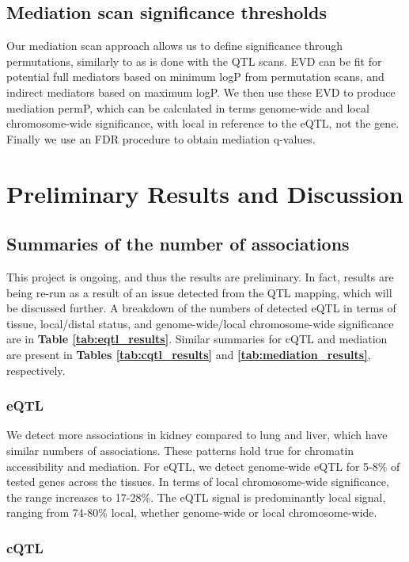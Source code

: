 \subsection{Mediation scan significance thresholds}

Our mediation scan approach allows us to define significance through permutations, similarly to as is done with the QTL scans. EVD can be fit for potential full mediators based on minimum logP from permutation scans, and indirect mediators based on maximum logP. We then use these EVD to produce mediation permP, which can be calculated in terms genome-wide and local chromosome-wide significance, with local in reference to the eQTL, not the gene. Finally we use an FDR procedure to obtain mediation q-values.

\section{Preliminary Results and Discussion}

\subsection{Summaries of the number of associations}

This project is ongoing, and thus the results are preliminary. In fact, results are being re-run as a result of an issue detected from the QTL mapping, which will be discussed further. A breakdown of the numbers of detected eQTL in terms of tissue, local/distal status, and genome-wide/local chromosome-wide significance are in \textbf{Table \ref{tab:eqtl_results}}. Similar summaries for cQTL and mediation are present in \textbf{Tables \ref{tab:cqtl_results}} and \textbf{\ref{tab:mediation_results}}, respectively. 

\subsubsection{eQTL}

We detect more associations in kidney compared to lung and liver, which have similar numbers of associations. These patterns hold true for chromatin accessibility and mediation. For eQTL, we detect genome-wide eQTL for 5-8\% of tested genes across the tissues. In terms of local chromosome-wide significance, the range increases to 17-28\%. The eQTL signal is predominantly local signal, ranging from 74-80\% local, whether genome-wide or local chromosome-wide. 

\subsubsection{cQTL}


